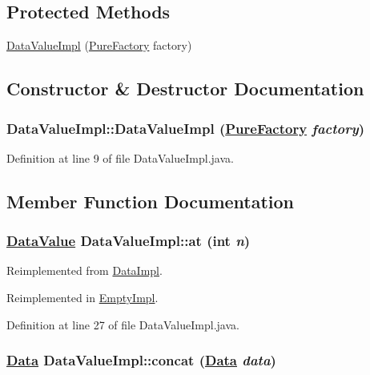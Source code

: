 \subsection*{Protected Methods}
\begin{CompactItemize}
\item 
\hyperlink{classDataValueImpl_b0}{Data\-Value\-Impl} (\hyperlink{classPureFactory}{Pure\-Factory} factory)
\end{CompactItemize}


\subsection{Constructor \& Destructor Documentation}
\hypertarget{classDataValueImpl_b0}{
\subsubsection[DataValueImpl]{\setlength{\rightskip}{0pt plus 5cm}Data\-Value\-Impl::Data\-Value\-Impl (\hyperlink{classPureFactory}{Pure\-Factory} {\em factory})}}
\label{classDataValueImpl_b0}




Definition at line 9 of file Data\-Value\-Impl.java.

\subsection{Member Function Documentation}
\hypertarget{classDataValueImpl_a4}{
\subsubsection[at]{\setlength{\rightskip}{0pt plus 5cm}\hyperlink{interfaceDataValue}{Data\-Value} Data\-Value\-Impl::at (int {\em n})}}
\label{classDataValueImpl_a4}




Reimplemented from \hyperlink{classDataImpl_a4}{Data\-Impl}.

Reimplemented in \hyperlink{classEmptyImpl_a0}{Empty\-Impl}.

Definition at line 27 of file Data\-Value\-Impl.java.\hypertarget{classDataValueImpl_a3}{
\subsubsection[concat]{\setlength{\rightskip}{0pt plus 5cm}\hyperlink{interfaceData}{Data} Data\-Value\-Impl::concat (\hyperlink{interfaceData}{Data} {\em data})}}
\label{classDataValueImpl_a3}




